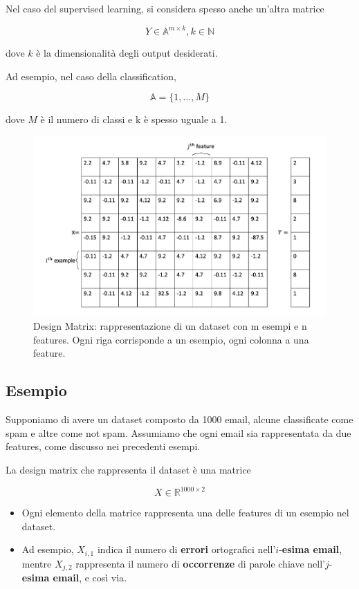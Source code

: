 \noindent
Nel caso del supervised learning, si considera spesso anche un'altra matrice

$$ Y \in \mathbb{A}^{m \times k}, k \in \mathbb{N}$$

\noindent
dove \( k \) è la dimensionalità degli output desiderati.

\noindent
Ad esempio, nel caso della classification,

\[ \mathbb{A} = \{1, \ldots, M\} \]

\noindent
dove \( M \) è il numero di classi e k è spesso uguale a 1.

\begin{figure}[htbp]
    \centering
    \includegraphics[width=\textwidth]{images/designMatrix.jpg}
    \caption{Design Matrix: rappresentazione di un dataset con m esempi e n features. Ogni riga corrisponde a un esempio, ogni colonna a una feature.}
    \label{fig:designMatrix}
\end{figure}

\subsection{Esempio}

Supponiamo di avere un dataset composto da 1000 email, alcune classificate come spam e altre come not spam. Assumiamo che ogni email sia rappresentata da due features, come discusso nei precedenti esempi.

\noindent
La design matrix che rappresenta il dataset è una matrice

$$ X \in \mathbb{R}^{1000 \times 2} $$

\begin{itemize}
\item Ogni elemento della matrice rappresenta una delle features di un esempio nel dataset.
\item Ad esempio, $ {X}_{i,1} $ indica il numero di \textbf{errori} ortografici nell’$i$-\textbf{esima email}, mentre $ {X}_{j,2} $ rappresenta il numero di \textbf{occorrenze} di parole chiave nell’$j$-\textbf{esima email}, e così via.
\end{itemize}

